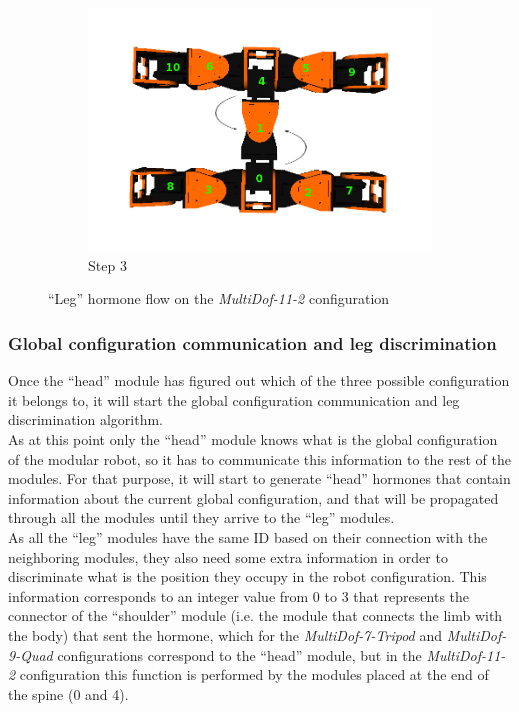 \begin{figure}[h]
\begin{subfigure}[b]{0.4\textwidth}
                \centering
                \includegraphics[width=\textwidth]{images/Hormone_protocol_11_2_step3.png}
                \caption{Step 3}
                \label{fig:11_2_step3}
        \end{subfigure}
        \caption{``Leg'' hormone flow on the \emph{MultiDof-11-2} configuration}\label{fig:global_conf_discovery_11_2}
\end{figure}


\subsubsection{Global configuration communication and leg discrimination}
\label{hormone_algorithm_head}

Once the ``head'' module has figured out which of the three possible configuration it belongs to, it will start the global configuration communication and leg discrimination algorithm.\\

As at this point only the ``head'' module knows what is the global configuration of the modular robot, so it has to communicate this information to the rest of the modules. For that purpose, it will start to generate ``head'' hormones that contain information about the current global configuration, and that will be propagated through all the modules until they arrive to the ``leg'' modules.\\

As all the ``leg'' modules have the same ID based on their connection with the neighboring modules, they also need some extra information in order to discriminate what is the position they occupy in the robot configuration. This information corresponds to an integer value from 0 to 3 that represents the connector of the ``shoulder'' module (i.e. the module that connects the limb with the body) that sent the hormone, which for the \emph{MultiDof-7-Tripod} and \emph{MultiDof-9-Quad} configurations correspond to the ``head'' module, but in the \emph{MultiDof-11-2} configuration this function is performed by the modules placed at the end of the spine (0 and 4).\\

